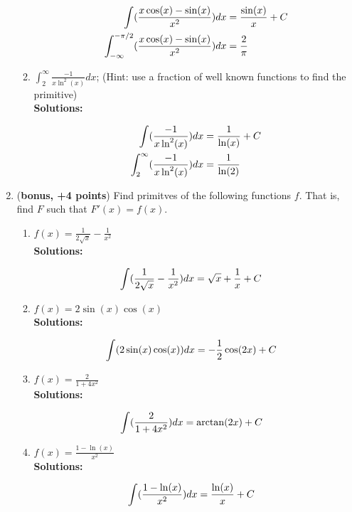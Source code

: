 \documentclass[a4paper]{article}
\begin{document}
\begin{enumerate}
\begin{enumerate}
\begin{align}
	\int(\frac{x \cos(x) - \sin(x)}{x^2})dx &= \frac{\sin(x)}{x} + C\notag\\
	\int_{-\infty}^{-\pi/2}(\frac{x \cos(x) - \sin(x)}{x^2})dx &= \frac{2}{\pi}\notag
\end{align}	


	\item $\int_{2}^{\infty}\frac{-1}{x \ln^2(x)} dx$; (Hint: use a fraction of well known functions to find the primitive)\\
	\textbf{Solutions:}	
	
\begin{align}
	\int(\frac{-1}{x \ln^2(x)})dx &= \frac{1}{\ln(x)} + C\notag\\
\int_{2}^{\infty}(\frac{-1}{x \ln^2(x)}) dx &= \frac{1}{\ln(2)}\notag
\end{align}	


\end{enumerate}


\item (\textbf{bonus, +4 points}) Find primitves of the following functions $f$. That is, find $F$ such that $F'(x) = f(x)$.

\begin{enumerate}
	\item $f(x) = \frac{1}{2 \sqrt{x}} - \frac{1}{x^2}$\\
	\textbf{Solutions:}		
	
\begin{align}
	\int(\frac{1}{2 \sqrt{x}} - \frac{1}{x^2})dx &= \sqrt{x} + \frac{1}{x} + C\notag
\end{align}		
	
	
	
	
	\item $f(x) = 2 \sin(x) \cos(x)$\\
	\textbf{Solutions:}	
	
\begin{align}
	\int(2 \sin(x) \cos(x))dx &= - \frac{1}{2} \cos(2x) + C\notag
\end{align}		
	
	
	\item $f(x) = \frac{2}{1 + 4x^2}$\\
	\textbf{Solutions:}		
	
\begin{align}
	\int(\frac{2}{1 + 4x^2})dx &= \arctan(2x) + C\notag
\end{align}			


	\item $f(x) = \frac{1 - \ln(x)}{x^2}$\\
	\textbf{Solutions:}		
	
\begin{align}
	\int(\frac{1 - \ln(x)}{x^2})dx &= \frac{\ln(x)}{x} + C\notag
\end{align}			
	

\end{enumerate}

\end{enumerate}
\end{document}
